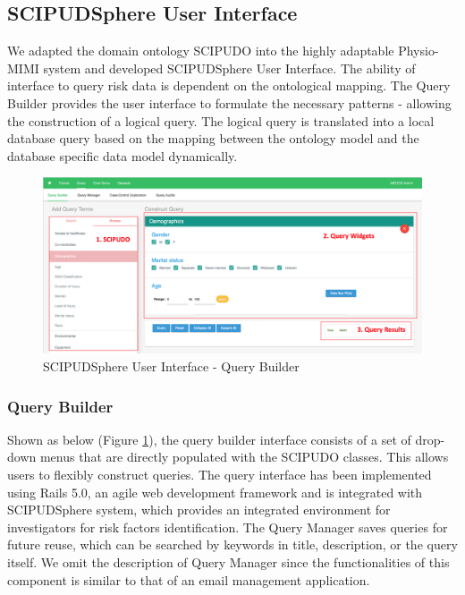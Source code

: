 \documentclass{amia}
\begin{document}

\subsection{SCIPUDSphere User Interface}
We adapted the domain ontology SCIPUDO into the highly adaptable Physio-MIMI system and developed SCIPUDSphere User Interface. The ability of interface to query risk data is dependent on the ontological mapping. The Query Builder provides the user interface to formulate the necessary patterns - allowing the construction of a logical query. The logical query is translated into a local database query based on the mapping between the ontology model and the database specific data model dynamically.

\begin{figure}[h!]
  \centering
  \includegraphics[scale=0.4]{pics/interface.png}
  \caption{SCIPUDSphere User Interface - Query Builder}
  \label{interface}
\end{figure}

\subsubsection{Query Builder}
Shown as below (Figure \ref{interface}), the query builder interface consists of a set of drop-down menus that are directly populated with the SCIPUDO classes. This allows users to flexibly construct queries. The query interface has been implemented using Rails 5.0, an agile web development framework and is integrated with SCIPUDSphere system, which provides an integrated environment for investigators for risk factors identification. The Query Manager saves queries for future reuse, which can be searched by keywords in title, description, or the query itself. We omit the description of Query Manager since the functionalities of this component is similar to that of an email management application.
\end{document}
